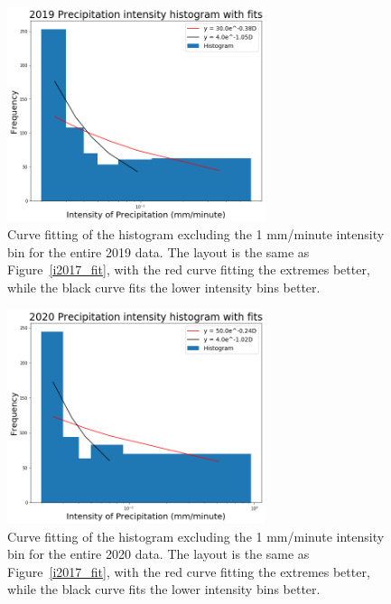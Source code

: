 \documentclass[11pt]{report}
\begin{document}
\clearpage
\begin{figure}[t]
  \centering
  \includegraphics[width=0.675\textwidth]{Figures/inten2019_fit.png}
  \caption[Fitting Intensity histogram for 2019 with different bins]
          {\label{i2019_fit}Curve fitting of the histogram excluding the 1
            mm/minute intensity bin for the entire 2019 data. The layout is
            the same as Figure~\ref{i2017_fit}, with the red curve fitting
            the extremes better, while the black curve fits the lower
            intensity bins better.  }
\end{figure}

\begin{figure}[b]
  \centering
  \includegraphics[width=0.675\textwidth]{Figures/inten2020_fit.png}
  \caption[Fitting Intensity histogram for 2020 with different bins]
          {\label{i2020_fit}Curve fitting of the histogram excluding the 1
            mm/minute intensity bin for the entire 2020 data. The layout is
            the same as Figure~\ref{i2017_fit}, with the red curve fitting
            the extremes better, while the black curve fits the lower
            intensity bins better.  }
\end{figure}
\end{document}
